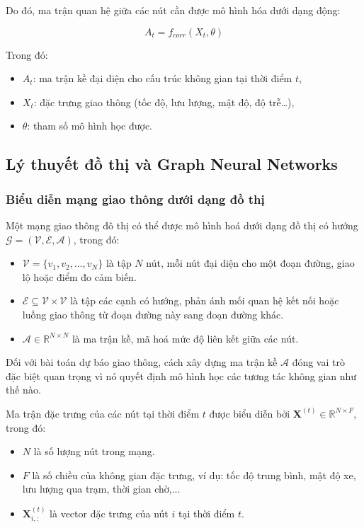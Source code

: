 Do đó, ma trận quan hệ giữa các nút cần được mô hình hóa dưới dạng động:

\begin{equation}
A_t = f_{corr}(X_t, \theta)
\end{equation}

Trong đó:
\begin{itemize}
    \item $A_t$: ma trận kề đại diện cho cấu trúc không gian tại thời điểm $t$,
    \item $X_t$: đặc trưng giao thông (tốc độ, lưu lượng, mật độ, độ trễ…),
    \item $\theta$: tham số mô hình học được.
\end{itemize}

\newpage

\subsection{Lý thuyết đồ thị và Graph Neural Networks}

\subsubsection{Biểu diễn mạng giao thông dưới dạng đồ thị}


Một mạng giao thông đô thị có thể được mô hình hoá dưới dạng đồ thị có hướng
$\mathcal{G} = (\mathcal{V}, \mathcal{E}, \mathcal{A})$, trong đó:
\begin{itemize}
    \item $\mathcal{V} = \{v_1, v_2, \dots, v_N\}$ là tập $N$ nút, mỗi nút đại diện cho một đoạn đường, giao lộ hoặc điểm đo cảm biến.
    \item $\mathcal{E} \subseteq \mathcal{V} \times \mathcal{V}$ là tập các cạnh có hướng, phản ánh mối quan hệ kết nối hoặc luồng giao thông từ đoạn đường này sang đoạn đường khác.
    \item $\mathcal{A} \in \mathbb{R}^{N \times N}$ là ma trận kề, mã hoá mức độ liên kết giữa các nút. 
\end{itemize}

Đối với bài toán dự báo giao thông, cách xây dựng ma trận kề $\mathcal{A}$ đóng vai trò đặc biệt quan trọng vì nó quyết định mô hình học các tương tác không gian như thế nào.


Ma trận đặc trưng của các nút tại thời điểm $t$ được biểu diễn bởi $\mathbf{X}^{(t)} \in \mathbb{R}^{N \times F}$, trong đó:
\begin{itemize}
    \item $N$ là số lượng nút trong mạng.
    \item $F$ là số chiều của không gian đặc trưng, ví dụ: tốc độ trung bình, mật độ xe, lưu lượng qua trạm, thời gian chờ,...
    \item $\mathbf{X}^{(t)}_{i,:}$ là vector đặc trưng của nút $i$ tại thời điểm $t$.
\end{itemize}

